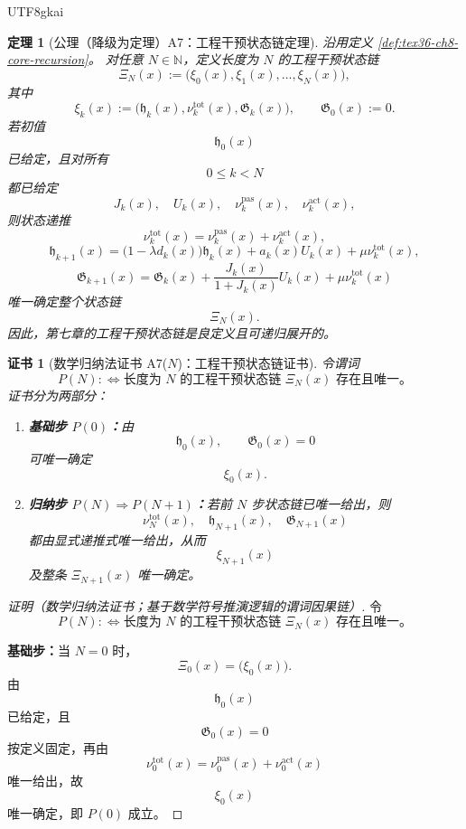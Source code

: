 \documentclass[12pt]{article}
\newtheorem{theorem}{定理}[section]
\newtheorem{Certificate}{证书}[section]
\newcommand{\NN}{\mathbb{N}}
\begin{document}
\begin{CJK*}{UTF8}{gkai}
\begin{theorem}[公理（降级为定理）A7：工程干预状态链定理]
\label{thm:tex36-a7}
沿用定义 \ref{def:tex36-ch8-core-recursion}。
对任意 $N\in\NN$，定义长度为 $N$ 的工程干预状态链
\[
  \Xi_N(x)
  :=
  \bigl(\xi_0(x),\xi_1(x),\ldots,\xi_N(x)\bigr),
\]
其中
\[
  \xi_k(x)
  :=
  \bigl(
    \mathfrak h_k(x),
    \nu_k^{\mathrm{tot}}(x),
    \mathfrak G_k(x)
  \bigr),
\qquad
  \mathfrak G_0(x):=0.
\]
若初值
\[
  \mathfrak h_0(x)
\]
已给定，且对所有
\[
  0\le k<N
\]
都已给定
\[
  J_k(x),\quad U_k(x),\quad
  \nu_k^{\mathrm{pas}}(x),\quad \nu_k^{\mathrm{act}}(x),
\]
则状态递推
\[
  \nu_k^{\mathrm{tot}}(x)
  =
  \nu_k^{\mathrm{pas}}(x)+\nu_k^{\mathrm{act}}(x),
\]
\[
  \mathfrak h_{k+1}(x)
  =
  \bigl(1-\lambda d_k(x)\bigr)\mathfrak h_k(x)
  +
  a_k(x)U_k(x)
  +
  \mu \nu_k^{\mathrm{tot}}(x),
\]
\[
  \mathfrak G_{k+1}(x)
  =
  \mathfrak G_k(x)
  +
  \frac{J_k(x)}{1+J_k(x)}U_k(x)
  +
  \mu \nu_k^{\mathrm{tot}}(x)
\]
唯一确定整个状态链
\[
  \Xi_N(x).
\]
因此，第七章的工程干预状态链是良定义且可递归展开的。
\end{theorem}

\begin{Certificate}[数学归纳法证书 A7($N$)：工程干预状态链证书]
\label{cert:tex36-a7}
令谓词
\[
  P(N)
  :
  \Longleftrightarrow
  \text{长度为 $N$ 的工程干预状态链 }\Xi_N(x)\text{ 存在且唯一。}
\]
证书分为两部分：
\begin{enumerate}
  \item \textbf{基础步 $P(0)$：}由
  \[
    \mathfrak h_0(x),\qquad \mathfrak G_0(x)=0
  \]
  可唯一确定
  \[
    \xi_0(x).
  \]
  \item \textbf{归纳步 $P(N)\Rightarrow P(N+1)$：}若前 $N$ 步状态链已唯一给出，则
  \[
    \nu_N^{\mathrm{tot}}(x),\quad
    \mathfrak h_{N+1}(x),\quad
    \mathfrak G_{N+1}(x)
  \]
  都由显式递推式唯一给出，从而
  \[
    \xi_{N+1}(x)
  \]
  及整条 $\Xi_{N+1}(x)$ 唯一确定。
\end{enumerate}
\end{Certificate}

\begin{proof}[证明（数学归纳法证书；基于数学符号推演逻辑的谓词因果链）]
令
\[
  P(N)
  :
  \Longleftrightarrow
  \text{长度为 $N$ 的工程干预状态链 }\Xi_N(x)\text{ 存在且唯一。}
\]

\textbf{基础步：}当 $N=0$ 时，
\[
  \Xi_0(x)=\bigl(\xi_0(x)\bigr).
\]
由
\[
  \mathfrak h_0(x)
\]
已给定，且
\[
  \mathfrak G_0(x)=0
\]
按定义固定，再由
\[
  \nu_0^{\mathrm{tot}}(x)
  =
  \nu_0^{\mathrm{pas}}(x)+\nu_0^{\mathrm{act}}(x)
\]
唯一给出，故
\[
  \xi_0(x)
\]
唯一确定，即 $P(0)$ 成立。


\end{proof}
\end{CJK*}
\end{document}
